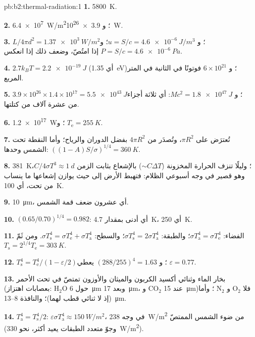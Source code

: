 \begin{solution}{pb:b2:thermal-radiation:1}
\textbf{1.} \qty{5800}{K}.

\textbf{2.} \qty{6.4e7}{W/m^2}؛ و \qty{3.9e26}{W}.

\textbf{3.} $L/4\pi d^2 = \qty{1.37e3}{W/m^2}$؛ و $u = S/c = \qty{4.6e-6}{J/m^3}$؛
و $P = S/c = \qty{4.6e-6}{Pa}$ إذا امتُصّ، وضعف ذلك إذا انعكس.

\textbf{4.} $2.7k_BT = \qty{2.2e-19}{J}$ (أي \qty{1.35}{eV})؛ و $6 \times 10^{21}$
فوتونًا في الثانية في المتر المربع.

\textbf{5.} $3.9 \times 10^{26} \times 1.4 \times 10^{17} = \qty{5.5e43}{J}$؛ و $Mc^2 =
\qty{1.8e47}{J}$: أي ثلاثة أجزاء من عشرة آلاف من كتلتها.

\textbf{6.} \qty{1.2e17}{W}؛ و $T_{\text{e}} = \qty{255}{K}$.

\textbf{7.} تُعترَض على $\pi R^2$، وتُصدَر من $4\pi R^2$ بفضل
الدوران والرياح؛ وأما النقطة تحت الشمس وحدها: $((1 - A)S/\sigma)^{1/4} =
\qty{360}{K}$.

\textbf{8.} \qty{381}{K}؛ وليلًا تنزف الحرارة المخزونة ($\sim C\Delta T$)
بالإشعاع بثابت الزمن $C/4\sigma T^3 \approx \qty{1}{d}$، وهو قصير
في وجه أسبوعي الظلام: فتهبط الأرض إلى حيث يوازن
إشعاعها ما ينساب من تحت، أي \qty{100}{K}.

\textbf{9.} \qty{10}{\micro m}، أي عشرون ضعف قمة الشمس.

\textbf{10.} $(0.65/0.70)^{1/4} = 0.982$: أي أدنى بمقدار \qty{4.7}{K}، أي \qty{250}{K}.

\textbf{11.} الفضاء: $\sigma T_{\text{a}}^4 = \sigma T_{\text{e}}^4$؛ والطبقة: $\sigma
T_{\text{s}}^4 = 2\sigma T_{\text{a}}^4$؛ والسطح: $\sigma T_{\text{s}}^4 = \sigma
T_{\text{e}}^4 + \sigma T_{\text{a}}^4$. ومن ثَمّ $T_{\text{s}} = 2^{1/4}T_{\text{e}} = \qty{303}{K}$.

\textbf{12.} $T_{\text{s}}^4 = T_{\text{e}}^4/(1 - \varepsilon/2)$؛ و $(288/255)^4 = 1.63$
يعطي $\varepsilon = 0.77$.

\textbf{13.} بخار الماء وثنائي أكسيد الكربون والميثان والأوزون تمتصّ في
تحت الأحمر (بعصابات اهتزاز: H$_2$O حول \qty{6}{\micro m} وبعد
\qty{17}{\micro m}، و CO$_2$ عند \qty{15}{\micro m})؛ وأما N$_2$ و O$_2$ فلا (إذ لا
ثنائي قطب لهما)؛ والنافذة \qty{8}{}--\qty{13}{\micro m}.

\textbf{14.} $T_{\text{a}}^4 = T_{\text{s}}^4/2$: $\varepsilon\sigma T_{\text{a}}^4 \approx
\qty{150}{W/m^2}$، في وجه \qty{238}{W/m^2} من ضوء الشمس الممتصّ (وجوّ
متعدد الطبقات يعيد أكثر، نحو \qty{330}{W/m^2}).


\end{solution}
